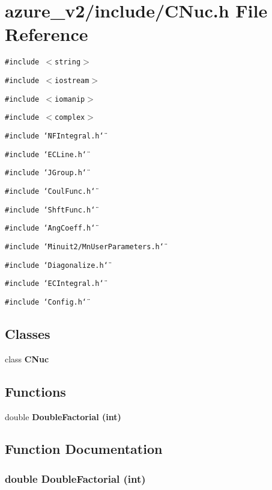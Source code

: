\section{azure\_\-v2/include/CNuc.h File Reference}
\label{CNuc_8h}
{\tt \#include $<$string$>$}\par
{\tt \#include $<$iostream$>$}\par
{\tt \#include $<$iomanip$>$}\par
{\tt \#include $<$complex$>$}\par
{\tt \#include \char`\"{}NFIntegral.h\char`\"{}}\par
{\tt \#include \char`\"{}ECLine.h\char`\"{}}\par
{\tt \#include \char`\"{}JGroup.h\char`\"{}}\par
{\tt \#include \char`\"{}Coul\-Func.h\char`\"{}}\par
{\tt \#include \char`\"{}Shft\-Func.h\char`\"{}}\par
{\tt \#include \char`\"{}Ang\-Coeff.h\char`\"{}}\par
{\tt \#include \char`\"{}Minuit2/Mn\-User\-Parameters.h\char`\"{}}\par
{\tt \#include \char`\"{}Diagonalize.h\char`\"{}}\par
{\tt \#include \char`\"{}ECIntegral.h\char`\"{}}\par
{\tt \#include \char`\"{}Config.h\char`\"{}}\par
\subsection*{Classes}
\begin{CompactItemize}
\item 
class \bf{CNuc}
\end{CompactItemize}
\subsection*{Functions}
\begin{CompactItemize}
\item 
double \bf{Double\-Factorial} (int)
\end{CompactItemize}


\subsection{Function Documentation}
\subsubsection{\setlength{\rightskip}{0pt plus 5cm}double Double\-Factorial (int)}\label{CNuc_8h_57ca9fa67eb8c85cf5382088b3325960}


